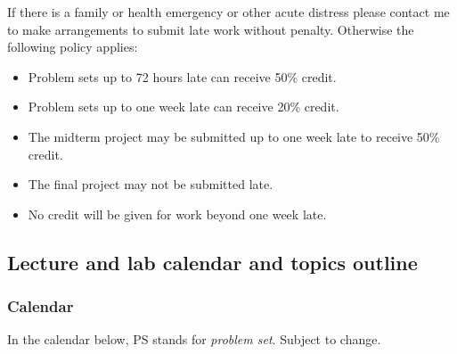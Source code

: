 \documentclass[
]{article}
\providecommand{\tightlist}{%
  \setlength{\itemsep}{0pt}\setlength{\parskip}{0pt}}
\begin{document}
If there is a family or health emergency or other acute distress please
contact me to make arrangements to submit late work without penalty.
Otherwise the following policy applies:

\begin{itemize}
\tightlist
\item
  Problem sets up to 72 hours late can receive 50\% credit.
\item
  Problem sets up to one week late can receive 20\% credit.
\item
  The midterm project may be submitted up to one week late to receive
  50\% credit.
\item
  The final project may not be submitted late.
\item
  No credit will be given for work beyond one week late.
\end{itemize}

\subsection{Lecture and lab calendar and topics
outline}\label{lecture-and-lab-calendar-and-topics-outline}

\subsubsection{Calendar}\label{calendar}

In the calendar below, PS stands for \emph{problem set}. Subject to
change.
\end{document}
